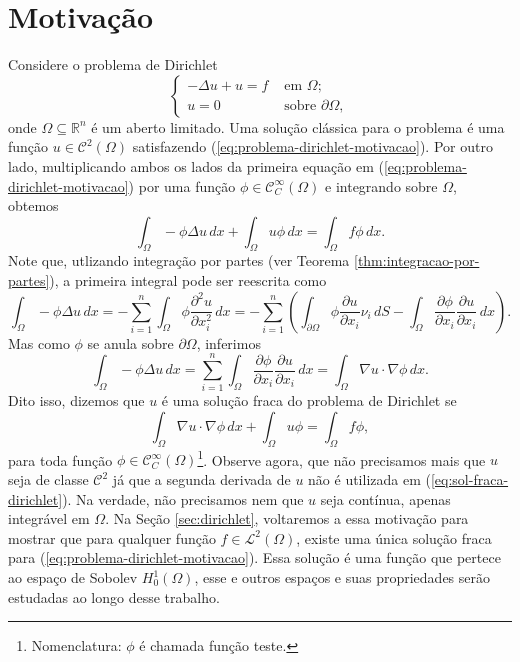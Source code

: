 \documentclass[a4paper, 11pt]{book}
\theoremstyle{definition}
\newcommand{\bR}{\mathbb{R}}
\newcommand{\cC}{\mathcal{C}}
\newcommand{\cL}{\mathcal{L}}
\begin{document}
\section{Motivação}
Considere o problema de Dirichlet
\begin{equation} \label{eq:problema-dirichlet-motivacao}
    \left\{  
        \begin{aligned}
            -\Delta u + u = f &\text{ em } \Omega;\\
            u = 0 &\text{ sobre } \partial\Omega,
        \end{aligned}
    \right.
\end{equation}
onde $\Omega \subseteq \bR^n$ é um aberto limitado.
Uma solução clássica para o problema é uma função $u \in \cC^2(\Omega)$ satisfazendo (\ref{eq:problema-dirichlet-motivacao}). 
Por outro lado, multiplicando ambos os lados da primeira equação em (\ref{eq:problema-dirichlet-motivacao}) por uma função $\phi \in \cC^{\infty}_C(\Omega)$ e integrando sobre $\Omega$, obtemos
\[
    \int_\Omega - \phi \Delta u \,dx + \int_\Omega u \phi \,dx = \int_\Omega f \phi \,dx.
\]
Note que, utlizando integração por partes (ver Teorema \ref{thm:integracao-por-partes}), a primeira integral pode ser reescrita como
\[
    \int_\Omega -\phi \Delta u \,dx = -\sum_{i=1}^n \int_\Omega \phi \frac{\partial^2 u}{\partial x_i^2} \,dx = -\sum_{i=1}^n \left( \int_{\partial\Omega} \phi \frac{\partial u}{\partial x_i} \nu_i \,dS - \int_\Omega \frac{\partial \phi}{\partial x_i} \frac{\partial u}{\partial x_i} \,dx\right).
\]
Mas como $\phi$ se anula sobre $\partial \Omega$, inferimos
\[
    \int_\Omega -\phi \Delta u \,dx = \sum_{i=1}^n \int_\Omega \frac{\partial \phi}{\partial x_i} \frac{\partial u}{\partial x_i} \,dx = \int_{\Omega} \nabla u \cdot \nabla \phi \,dx.
\]
Dito isso, dizemos que $u$ é uma solução fraca do problema de Dirichlet se
\begin{equation} \label{eq:sol-fraca-dirichlet}
    \int_{\Omega} \nabla u \cdot \nabla \phi \,dx + \int_\Omega u\phi = \int_\Omega f \phi,
\end{equation}
para toda função $\phi \in \cC^{\infty}_C(\Omega)$\footnote{Nomenclatura: $\phi$ é chamada função teste.}.
Observe agora, que não precisamos mais que $u$ seja de classe $\cC^2$ já que a segunda derivada de $u$ não é utilizada em (\ref{eq:sol-fraca-dirichlet}). Na verdade, não precisamos nem que $u$ seja contínua, apenas integrável em $\Omega$.
Na Seção \ref{sec:dirichlet}, voltaremos a essa motivação para mostrar que para qualquer função $f \in \cL^2(\Omega)$, existe uma única solução fraca para (\ref{eq:problema-dirichlet-motivacao}). 
Essa solução é uma função que pertece ao espaço de Sobolev $H^1_0(\Omega)$, esse e outros espaços e suas propriedades serão estudadas ao longo desse trabalho.
\end{document}
